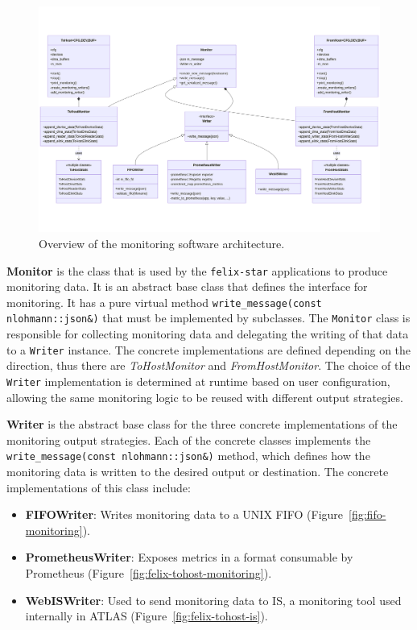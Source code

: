 \begin{figure}
\centering
\includegraphics[width=\textwidth]{images/contributions/monitoring-uml.png}
\caption{Overview of the monitoring software architecture.}
\label{fig:monitoring-software-architecture}
\end{figure}

\textbf{Monitor} is the class that is used by the \texttt{felix-star} applications to produce monitoring data. It is an abstract base class that defines the interface for monitoring. It has a pure virtual method \texttt{write\_message(const nlohmann::json\&)} that must be implemented by subclasses. The \texttt{Monitor} class is responsible for collecting monitoring data and delegating the writing of that data to a \texttt{Writer} instance. The concrete implementations are defined depending on the direction, thus there are \emph{ToHostMonitor} and \emph{FromHostMonitor}. The choice of the \texttt{Writer} implementation is determined at runtime based on user configuration, allowing the same monitoring logic to be reused with different output strategies.

\textbf{Writer} is the abstract base class for the three concrete implementations of the monitoring output strategies. Each of the concrete classes implements the\\ \texttt{write\_message(const nlohmann::json\&)} method, which defines how the monitoring data is written to the desired output or destination. The concrete implementations of this class include:

\begin{itemize}
    \item \textbf{FIFOWriter}: Writes monitoring data to a UNIX FIFO (Figure~\ref{fig:fifo-monitoring}).
    \item \textbf{PrometheusWriter}: Exposes metrics in a format consumable by Prometheus (Figure~\ref{fig:felix-tohost-monitoring}).
    \item \textbf{WebISWriter}: Used to send monitoring data to \acs{IS}, a monitoring tool used internally in \acs{ATLAS} (Figure~\ref{fig:felix-tohost-is}).
\end{itemize}

